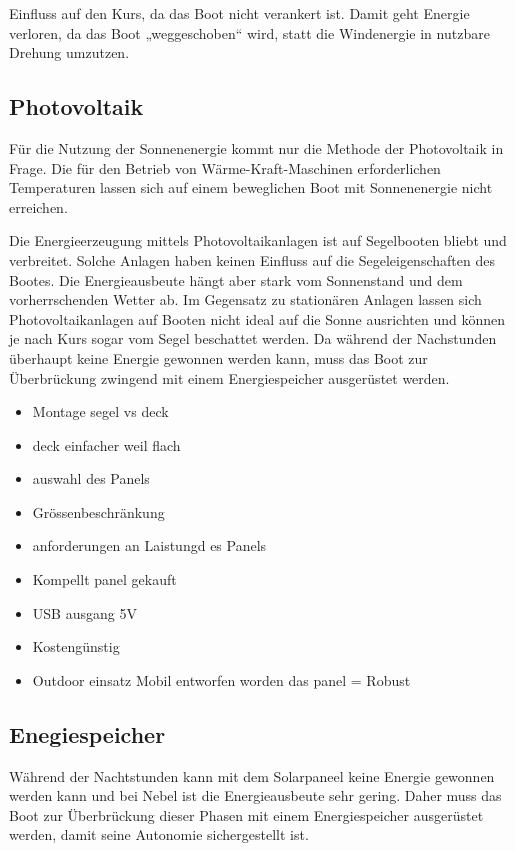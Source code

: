 Einfluss auf den Kurs, da das Boot nicht verankert ist. Damit geht Energie verloren, da das Boot „weggeschoben“ wird, statt die Windenergie in nutzbare Drehung umzutzen.

\subsection{Photovoltaik}
Für die Nutzung der Sonnenenergie kommt nur die Methode der Photovoltaik in Frage. Die für den Betrieb von Wärme-Kraft-Maschinen erforderlichen Temperaturen lassen sich auf einem beweglichen Boot mit Sonnenenergie nicht erreichen.

Die Energieerzeugung mittels Photovoltaikanlagen ist auf Segelbooten bliebt und verbreitet. Solche Anlagen haben keinen Einfluss auf die Segeleigenschaften des Bootes. Die Energieausbeute hängt aber stark vom Sonnenstand und dem vorherrschenden Wetter ab. Im Gegensatz zu stationären Anlagen lassen sich Photovoltaikanlagen auf Booten nicht ideal auf die Sonne ausrichten und können je nach Kurs sogar vom Segel beschattet werden. Da während der Nachstunden überhaupt keine Energie gewonnen werden kann, muss das Boot zur Überbrückung zwingend mit einem Energiespeicher ausgerüstet werden.

\begin{itemize}
    \item Montage segel vs deck
    \item deck einfacher weil flach
    \item auswahl des Panels
    \item Grössenbeschränkung
    \item anforderungen an Laistungd es Panels
    \item Kompellt panel gekauft
    \item USB ausgang 5V
    \item Kostengünstig
    \item Outdoor einsatz Mobil entworfen worden das panel = Robust


\end{itemize}

\subsection{Enegiespeicher}
Während der Nachtstunden kann mit dem Solarpaneel keine Energie gewonnen werden kann und bei Nebel ist die Energieausbeute sehr gering. Daher muss das Boot zur Überbrückung dieser Phasen mit einem Energiespeicher ausgerüstet werden, damit seine Autonomie sichergestellt ist.

